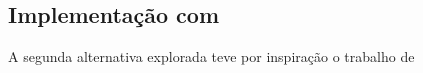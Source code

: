 \subsection{Implementação com \flink}

A segunda alternativa explorada teve por inspiração o trabalho de













